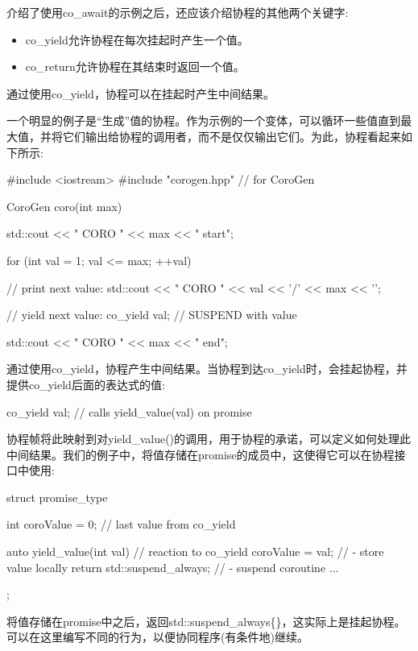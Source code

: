 
介绍了使用co\_await的示例之后，还应该介绍协程的其他两个关键字:

\begin{itemize}
\item 
co\_yield允许协程在每次挂起时产生一个值。

\item 
co\_return允许协程在其结束时返回一个值。
\end{itemize}


通过使用co\_yield，协程可以在挂起时产生中间结果。

一个明显的例子是“生成”值的协程。作为示例的一个变体，可以循环一些值直到最大值，并将它们输出给协程的调用者，而不是仅仅输出它们。为此，协程看起来如下所示:


\begin{cpp}
#include <iostream>
#include "corogen.hpp" // for CoroGen

CoroGen coro(int max)
{
	std::cout << "            CORO " << max << " start\n";
	
	for (int val = 1; val <= max; ++val) {
		// print next value:
		std::cout << "              CORO " << val << '/' << max << '\n';
		
		// yield next value:
		co_yield val; // SUSPEND with value
	}
	std::cout << "            CORO " << max << " end\n";
}
\end{cpp}

通过使用co\_yield，协程产生中间结果。当协程到达co\_yield时，会挂起协程，并提供co\_yield后面的表达式的值:

\begin{cpp}
co_yield val; // calls yield_value(val) on promise
\end{cpp}

协程帧将此映射到对yield\_value()的调用，用于协程的承诺，可以定义如何处理此中间结果。我们的例子中，将值存储在promise的成员中，这使得它可以在协程接口中使用:

\begin{cpp}
struct promise_type {
	int coroValue = 0; // last value from co_yield
	
	auto yield_value(int val) { // reaction to co_yield
	coroValue = val; // - store value locally
	return std::suspend_always{}; // - suspend coroutine
	}
	...
};
\end{cpp}

将值存储在promise中之后，返回std::suspend\_always\{\}，这实际上是挂起协程。可以在这里编写不同的行为，以便协同程序(有条件地)继续。

